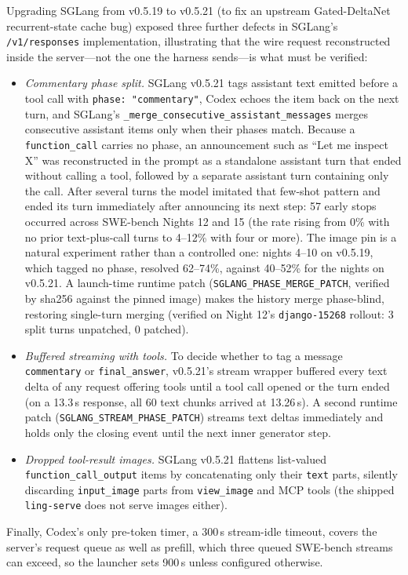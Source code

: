 \documentclass[11pt]{article}
\newcommand{\code}[1]{\texttt{#1}}
\begin{document}
Upgrading SGLang from v0.5.19 to v0.5.21 (to fix an upstream Gated-DeltaNet recurrent-state cache
bug) exposed three further defects in SGLang's \code{/v1/responses} implementation, illustrating
that the wire request reconstructed inside the server—not the one the harness sends—is what must be
verified:
\begin{itemize}
\item \emph{Commentary phase split.} SGLang v0.5.21 tags assistant
text emitted before a tool call with \code{phase: "commentary"}, Codex echoes the item back on the
next turn, and SGLang's \code{\_merge\_consecutive\_assistant\_messages} merges consecutive
assistant items only when their phases match. Because a \code{function\_call} carries no phase, an
announcement such as ``Let me inspect X'' was reconstructed in the prompt as a standalone assistant
turn that ended without calling a tool, followed by a separate assistant turn containing only the
call. After several turns the model imitated that few-shot pattern and ended its turn immediately
after announcing its next step: 57 early stops occurred across SWE-bench Nights 12 and 15 (the rate
rising from 0\% with no prior text-plus-call turns to 4--12\% with four or more). The image pin is
a natural experiment rather than a controlled one: nights 4--10 on v0.5.19, which tagged no phase,
resolved 62--74\%, against 40--52\% for the nights on v0.5.21. A launch-time runtime patch
(\code{SGLANG\_PHASE\_MERGE\_PATCH}, verified by sha256 against the pinned image) makes the history
merge phase-blind, restoring single-turn merging (verified on Night 12's \code{django-15268}
rollout: 3 split turns unpatched, 0 patched).
\item \emph{Buffered streaming with tools.} To decide whether to tag a message \code{commentary} or
\code{final\_answer}, v0.5.21's stream wrapper buffered every text delta of any request offering
tools until a tool call opened or the turn ended (on a 13.3\,s response, all 60 text chunks arrived
at 13.26\,s). A second runtime patch (\code{SGLANG\_STREAM\_PHASE\_PATCH}) streams text deltas
immediately and holds only the closing event until the next inner generator step.
\item \emph{Dropped tool-result images.} SGLang v0.5.21 flattens list-valued
\code{function\_call\_output} items by concatenating only their \code{text} parts, silently
discarding \code{input\_image} parts from \code{view\_image} and MCP tools (the shipped
\code{ling-serve} does not serve images either).
\end{itemize}
Finally, Codex's only pre-token timer, a 300\,s stream-idle timeout, covers the server's request
queue as well as prefill, which three queued SWE-bench streams can exceed, so the launcher sets
900\,s unless configured otherwise.
\end{document}
